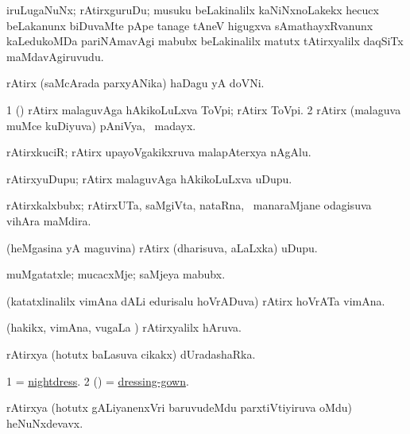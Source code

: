 \bentry
{}
\gl{\nA}
\bmng
iruLugaNuNx; rAtirxguruDu; musuku beLakinalilx kaNiNxnoLakekx hecucx beLakanunx biDuvaMte pApe tanage tAneV higugxva sAmathayxRvanunx kaLedukoMDa pariNAmavAgi mabubx beLakinalilx matutx tAtirxyalilx daqSiTx maMdavAgiruvudu. 
\emng
\eentry

\bentry
{}
\gl{\nA}
\bmng
rAtirx (saMcArada parxyANika) haDagu yA doVNi. 
\emng
\eentry

\bentry
{}
\gl{\nA}
\bmng
\bnum
\num{1} (\ca) rAtirx malaguvAga hAkikoLuLxva ToVpi; rAtirx ToVpi. 
\num{2} rAtirx (malaguva muMce kuDiyuva) pAniVya, \kanmu\ madayx. 
\enum
\emng
\eentry

\bentry
{}
\gl{\nA}
\bmng
rAtirxkuciR; rAtirx upayoVgakikxruva malapAterxya nAgAlu. 
\emng
\eentry

\bentry
{}
\gl{\nA}
\bmng
rAtirxyuDupu; rAtirx malaguvAga hAkikoLuLxva uDupu. 
\emng
\eentry

\bentry
{}
\gl{\nA}
\bmng
rAtirxkalxbubx; rAtirxUTa, saMgiVta, nataRna, \mo\ manaraMjane odagisuva vihAra maMdira. 
\emng
\eentry

\bentry
{}
\gl{\nA}
\bmng
(heMgasina yA maguvina) rAtirx (dharisuva, aLaLxka) uDupu. 
\emng
\eentry

\bentry
{}
\gl{\nA}
\bmng
muMgatatxle; mucacxMje; saMjeya mabubx. 
\emng
\eentry

\bentry
{}
\gl{\nA}
\bmng
(katatxlinalilx vimAna dALi edurisalu hoVrADuva) rAtirx hoVrATa vimAna. 
\emng
\eentry

\bentry
{}
\gl{\gu}
\bmng
(hakikx, vimAna, \mo vugaLa \vi) rAtirxyalilx hAruva. 
\emng
\eentry

\bentry
{}
\gl{\nA}
\bmng
rAtirxya (hotutx baLasuva cikakx) dUradashaRka. 
\emng
\eentry

\bentry
{}
\gl{\nA}
\bmng
\bnum
\num{1} = \hyperlink{nightdress}{nightdress}. 
\num{2} (\ca) = \hyperref{kandict_d.pdf}{D}{dressing-gown}{dressing-gown}. 
\enum
\emng
\eentry

\bentry
{}
\gl{\nA}
\bmng
rAtirxya (hotutx gALiyanenxVri baruvudeMdu parxtiVtiyiruva oMdu) heNuNxdevavx. 
\emng
\eentry

